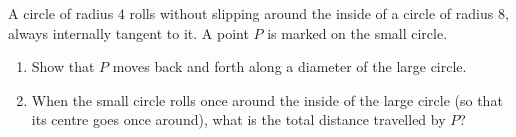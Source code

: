 A circle of radius $4$ rolls without slipping around the inside of a circle of radius $8$, always internally tangent to it. A point $P$ is marked on the small circle.
\begin{enumerate}
\item[(a)] Show that $P$ moves back and forth along a diameter of the large circle.
\item[(b)] When the small circle rolls once around the inside of the large circle (so that its centre goes once around), what is the total distance travelled by $P$?
\end{enumerate}

